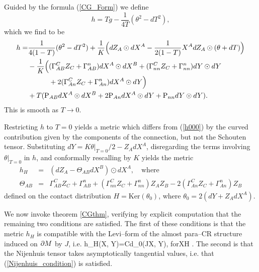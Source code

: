 Guided by the formula (\ref{CG_Form}) we define
\[
h=Tg-\frac{1}{4T}(\theta^2-dT^2),
\]
which we find to be
\begin{equation*}
\begin{split}
h=&
\frac{1}{4(1-T)}(\theta^2-dT^2)+\frac{1}{K}\Big(dZ_A\odot dX^A-\frac{1}{2(1-T)}
X^A dZ_A\odot (\theta+dT)\Big)\\
&-\frac{1}{K}\Big(
(\Gamma_{AB}^CZ_C+\Gamma_{AB}^n)dX^A\odot dX^B+
(\Gamma_{nn}^CZ_C+\Gamma_{nn}^n)dY\odot dY \\
&\qquad\quad + 2(\Gamma_{An}^CZ_C+\Gamma_{An}^n)dX^A\odot dY\Big)\\
&+T(\mathrm{P}_{AB}dX^A\odot dX^B+2\mathrm{P}_{An}dX^A\odot dY+\mathrm{P}_{nn}dY\odot dY).
\end{split}
\end{equation*}
This is  smooth as $T\rightarrow 0$.

Restricting $h$ to $T=0$ yields a metric which differs from
(\ref{h000}) by the curved contribution given by the components of the  connection, but not the Schouten tensor. Substituting $dY=K\theta|_{T=0}/2-Z_AdX^A$, disregarding the terms involving $\theta|_{T=0}$ in $h$, and conformally rescalling by 
$K$ yields the metric
\begin{eqnarray}
\label{met_th}
h_{ H }&=&(dZ_A-\Theta_{AB}dX^B)\odot dX^A,\quad
\mbox{where}\\
\Theta_{AB}&=&\Gamma_{AB}^CZ_C+\Gamma_{AB}^n+
(\Gamma_{nn}^CZ_C+\Gamma_{nn}^n)Z_AZ_B-
2(\Gamma_{An}^CZ_C+\Gamma_{An}^n)Z_B\nonumber
\end{eqnarray}
defined on the contact distribution ${ H }=\mbox{Ker}(\theta_0)$, 
where $\theta_0=2(dY+Z_AdX^A)$.

We now invoke theorem \ref{CGthm},  verifying
by explicit computation that the remaining two conditions are satisfied. The first of these conditions is that the metric $h_{ H }$ is compatible with the Levi--form of the almost para--CR structure induced on $\partial M$ by $J$, i.e.
\be
\label{boundary_compatibility}
h_H(X, Y)=Cd\theta_0(JX, Y), \quad\mbox{for}\quad X\in H .
\ee
{}
The second is that the Nijenhuis tensor takes asymptotically tangential values, i.e. that (\ref{Nijenhuis_condition}) is satisfied.


